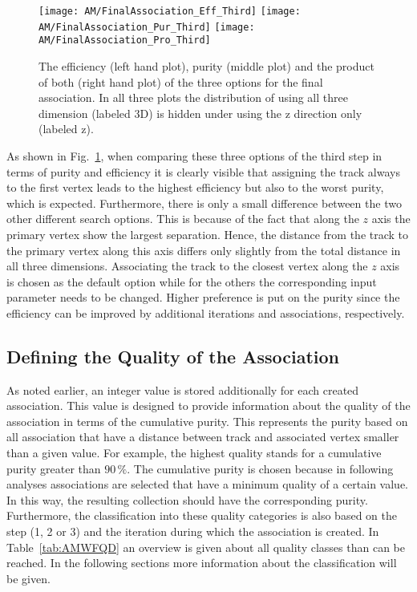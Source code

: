 \begin{figure}[!ht]
    \centering
    \texttt{[image: AM/FinalAssociation\_Eff\_Third]}
    \texttt{[image: AM/FinalAssociation\_Pur\_Third]}
    \texttt{[image: AM/FinalAssociation\_Pro\_Third]}
    \caption[Efficiency, purity and their product for the three options for the final association]{The efficiency (left hand plot), purity (middle plot) and the product of both (right hand plot) of the three options for the final association. In all three plots the distribution of using all three dimension (labeled 3D) is hidden under using the z direction only (labeled z). \label{plot:AMWFFA}}
\end{figure}

As shown in Fig.~\ref{plot:AMWFFA}, when comparing these three options of the third step in terms of purity and efficiency it is clearly visible that assigning the track always to the first vertex leads to the highest efficiency but also to the worst purity, which is expected. Furthermore, there is only a small difference between the two other different search options. This is because of the fact that along the $z$ axis the primary vertex show the largest separation. Hence, the distance from the track to the primary vertex along this axis differs only slightly from the total distance in all three dimensions. Associating the track to the closest vertex along the $z$ axis is chosen as the default option while for the others the corresponding input parameter needs to be changed. Higher preference is put on the purity since the efficiency can be improved by additional iterations and associations, respectively.

\subsection{Defining the Quality of the Association\label{sec:AMWFQD}}

As noted earlier, an integer value is stored additionally for each created association. This value is designed to provide information about the quality of the association in terms of the cumulative purity. This represents the purity based on all association that have a distance between track and associated vertex smaller than a given value. For example, the highest quality stands for a cumulative purity greater than $90\,\%$. The cumulative purity is chosen because in following analyses associations are selected that have a minimum quality of a certain value. In this way, the resulting collection should have the corresponding purity.  Furthermore, the classification into these quality categories is also based on the step (1, 2 or 3) and the iteration during which the association is created. In Table~\ref{tab:AMWFQD} an overview is given about all quality classes than can be reached. In the following sections more information about the classification will be given.

